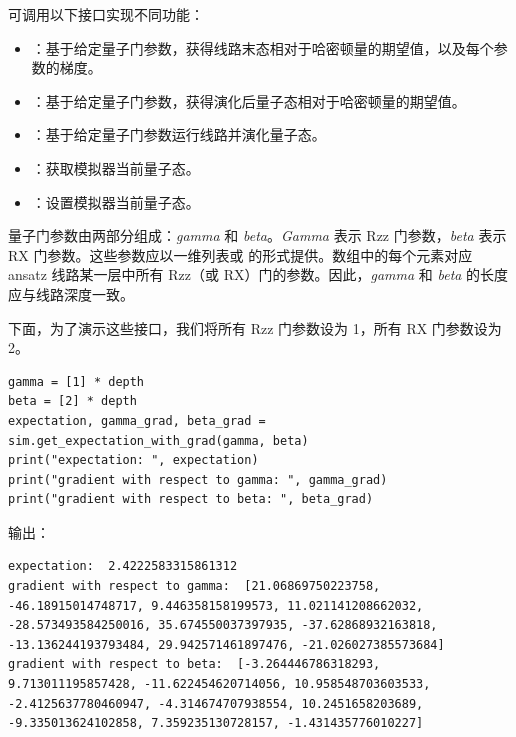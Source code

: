 可调用以下接口实现不同功能：

\begin{itemize}
    \item {}：基于给定量子门参数，获得线路末态相对于哈密顿量的期望值，以及每个参数的梯度。
    \item {}：基于给定量子门参数，获得演化后量子态相对于哈密顿量的期望值。
    \item {}：基于给定量子门参数运行线路并演化量子态。
    \item {}：获取模拟器当前量子态。
    \item {}：设置模拟器当前量子态。
\end{itemize}

量子门参数由两部分组成：\textit{gamma} 和 \textit{beta}。\textit{Gamma} 表示 Rzz 门参数，\textit{beta} 表示 RX 门参数。这些参数应以一维列表或  的形式提供。数组中的每个元素对应 ansatz 线路某一层中所有 Rzz（或 RX）门的参数。因此，\textit{gamma} 和 \textit{beta} 的长度应与线路深度一致。

下面，为了演示这些接口，我们将所有 Rzz 门参数设为 1，所有 RX 门参数设为 2。

\begin{lstlisting}
gamma = [1] * depth
beta = [2] * depth
expectation, gamma_grad, beta_grad = sim.get_expectation_with_grad(gamma, beta)
print("expectation: ", expectation)
print("gradient with respect to gamma: ", gamma_grad)
print("gradient with respect to beta: ", beta_grad)
\end{lstlisting}
输出：
\begin{lstlisting}
expectation:  2.4222583315861312
gradient with respect to gamma:  [21.06869750223758, -46.18915014748717, 9.446358158199573, 11.021141208662032, -28.573493584250016, 35.674550037397935, -37.62868932163818, -13.136244193793484, 29.942571461897476, -21.026027385573684]
gradient with respect to beta:  [-3.264446786318293, 9.713011195857428, -11.622454620714056, 10.958548703603533, -2.4125637780460947, -4.314674707938554, 10.2451658203689, -9.335013624102858, 7.359235130728157, -1.431435776010227]
\end{lstlisting}
